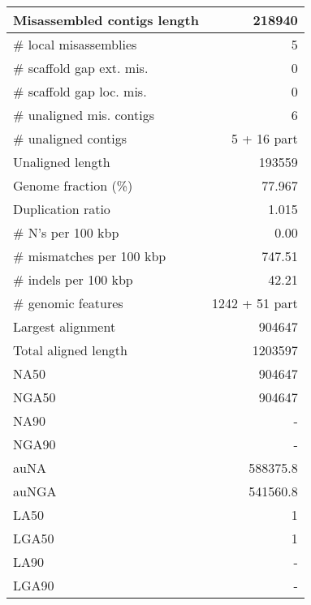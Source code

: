 \documentclass[12pt,a4paper]{article}
\begin{document}
\begin{table}[ht]
\begin{center}
\begin{tabular}{|l*{1}{|r}|}
Misassembled contigs length & 218940 \\ \hline
\# local misassemblies & 5 \\ \hline
\# scaffold gap ext. mis. & 0 \\ \hline
\# scaffold gap loc. mis. & 0 \\ \hline
\# unaligned mis. contigs & 6 \\ \hline
\# unaligned contigs & 5 + 16 part \\ \hline
Unaligned length & 193559 \\ \hline
Genome fraction (\%) & 77.967 \\ \hline
Duplication ratio & 1.015 \\ \hline
\# N's per 100 kbp & 0.00 \\ \hline
\# mismatches per 100 kbp & 747.51 \\ \hline
\# indels per 100 kbp & 42.21 \\ \hline
\# genomic features & 1242 + 51 part \\ \hline
Largest alignment & 904647 \\ \hline
Total aligned length & 1203597 \\ \hline
NA50 & 904647 \\ \hline
NGA50 & 904647 \\ \hline
NA90 & - \\ \hline
NGA90 & - \\ \hline
auNA & 588375.8 \\ \hline
auNGA & 541560.8 \\ \hline
LA50 & 1 \\ \hline
LGA50 & 1 \\ \hline
LA90 & - \\ \hline
LGA90 & - \\ \hline
\end{tabular}
\end{center}
\end{table}
\end{document}
